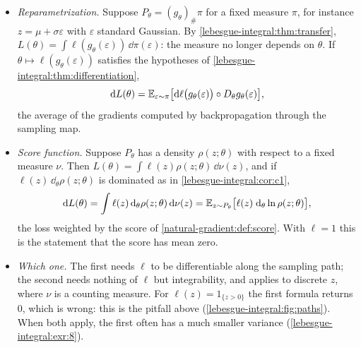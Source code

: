 \begin{notechapter}
\begin{mlthread}
\begin{itemize}[nosep]
  \item \emph{Reparametrization.} Suppose $P_\theta = (g_\theta)_\#\pi$
        for a fixed measure $\pi$, for instance
        $z = \mu + \sigma\varepsilon$ with $\varepsilon$ standard
        Gaussian. By \cref{lebesgue-integral:thm:transfer},
        $L(\theta) = \int\ell(g_\theta(\varepsilon))\,\dd\pi(\varepsilon)$:
        the measure no longer depends on $\theta$. If
        $\theta\mapsto\ell(g_\theta(\varepsilon))$ satisfies the
        hypotheses of \cref{lebesgue-integral:thm:differentiation},
        \[
          \mathrm{d} L(\theta) = \mathbb{E}_{\varepsilon\sim\pi}
          \bigl[\mathrm{d}\ell\bigl(g_\theta(\varepsilon)\bigr)
          \circ D_\theta g_\theta(\varepsilon)\bigr] ,
        \]
        the average of the gradients computed by backpropagation
        through the sampling map.
  \item \emph{Score function.} Suppose $P_\theta$ has a density
        $\rho(z; \theta)$ with respect to a fixed measure $\nu$. Then
        $L(\theta) = \int\ell(z)\rho(z; \theta)\,\dd\nu(z)$, and if
        $\ell(z)\,\dd_\theta\rho(z; \theta)$ is dominated as in
        \cref{lebesgue-integral:cor:c1},
        \[
          \mathrm{d} L(\theta) = \int\ell(z)\,\mathrm{d}_\theta\rho(z; \theta)\,\mathrm{d}\nu(z)
          = \mathbb{E}_{z\sim P_\theta}
          \bigl[\ell(z)\;\mathrm{d}_\theta\ln\rho(z; \theta)\bigr] ,
        \]
        the loss weighted by the score of
        \cref{natural-gradient:def:score}. With $\ell = 1$ this is the
        statement that the score has mean zero.
  \item \emph{Which one.} The first needs $\ell$ to be differentiable
        along the sampling path; the second needs nothing of $\ell$ but
        integrability, and applies to discrete $z$, where $\nu$ is a
        counting measure. For $\ell(z) = 1_{\{z > 0\}}$ the first formula
        returns $0$, which is wrong: this is the pitfall above
        (\cref{lebesgue-integral:fig:paths}). When both apply, the
        first often has a much smaller variance
        (\cref{lebesgue-integral:exr:8}).
\end{itemize}
\end{mlthread}


\end{notechapter}
